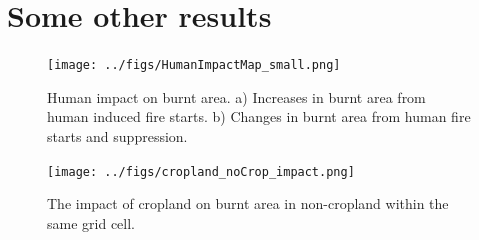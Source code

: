 \section{Some other results}

\begin{figure}[!ht]
  \centering
    \texttt{[image: ../figs/HumanImpactMap\_small.png]}

  \caption{Human impact on burnt area.
            a) Increases in burnt area from human induced fire starts.
            b) Changes in burnt area from human fire starts and suppression.}
    \label{fig:human_impact}
\end{figure}

\begin{figure}
  \centering
    \texttt{[image: ../figs/cropland\_noCrop\_impact.png]}

  \caption{The impact of cropland on burnt area in non-cropland within the same grid cell.}
\end{figure}
